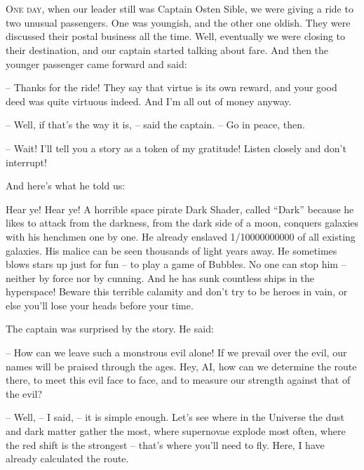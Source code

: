 \documentclass[ebook,twoside,final,openright]{memoir}
\begin{document}
\chapter{}
\par
\lettrine{O}{ne day,} when our leader still was Captain Osten Sible, we were giving a ride to two unusual passengers. One was youngish, and the other one oldish. They were discussed their postal business all the time. Well, eventually we were closing to their destination, and our captain started talking about fare. And then the younger passenger came forward and said: \par
\par
– Thanks for the ride! They say that virtue is its own reward, and your good deed was quite virtuous indeed. And I’m all out of money anyway.\par
– Well, if that’s the way it is, – said the captain. – Go in peace, then. \par
– Wait! I'll tell you a story as a token of my gratitude! Listen closely and don’t interrupt! \par
 And here’s what he told us:\par
\par
Hear ye! Hear ye! A horrible space pirate Dark Shader, called “Dark” because he likes to attack from the darkness, from the dark side of a moon, conquers galaxies with his henchmen one by one. He already enslaved 1/10000000000 of all existing galaxies. His malice can be seen thousands of light years away. He sometimes blows stars up just for fun – to play a game of Bubbles. No one can stop him – neither by force nor by cunning. And he has sunk countless ships in the hyperspace! Beware this terrible calamity and don’t try to be heroes in vain, or else you’ll lose your heads before your time.\par
\par
The captain was surprised by the story. He said:\par
– How can we leave such a monstrous evil alone! If we prevail over the evil, our names will be praised through the ages. Hey, AI, how can we determine the route there, to meet this evil face to face, and to measure our strength against that of the evil?\par
– Well, – I said, – it is simple enough. Let's see where in the Universe the dust and dark matter gather the most, where supernovae explode most often, where the red shift is the strongest – that’s where you’ll need to fly. Here, I have already calculated the route.\par
\end{document}
